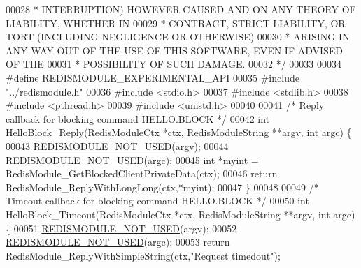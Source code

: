 \begin{DoxyCode}
00028 \textcolor{comment}{ * INTERRUPTION) HOWEVER CAUSED AND ON ANY THEORY OF LIABILITY, WHETHER IN}
00029 \textcolor{comment}{ * CONTRACT, STRICT LIABILITY, OR TORT (INCLUDING NEGLIGENCE OR OTHERWISE)}
00030 \textcolor{comment}{ * ARISING IN ANY WAY OUT OF THE USE OF THIS SOFTWARE, EVEN IF ADVISED OF THE}
00031 \textcolor{comment}{ * POSSIBILITY OF SUCH DAMAGE.}
00032 \textcolor{comment}{ */}
00033 
00034 \textcolor{preprocessor}{#}\textcolor{preprocessor}{define} \textcolor{preprocessor}{REDISMODULE\_EXPERIMENTAL\_API}
00035 \textcolor{preprocessor}{#}\textcolor{preprocessor}{include} \textcolor{preprocessor}{"../redismodule.h"}
00036 \textcolor{preprocessor}{#}\textcolor{preprocessor}{include} \textcolor{preprocessor}{<}\textcolor{preprocessor}{stdio}\textcolor{preprocessor}{.}\textcolor{preprocessor}{h}\textcolor{preprocessor}{>}
00037 \textcolor{preprocessor}{#}\textcolor{preprocessor}{include} \textcolor{preprocessor}{<}\textcolor{preprocessor}{stdlib}\textcolor{preprocessor}{.}\textcolor{preprocessor}{h}\textcolor{preprocessor}{>}
00038 \textcolor{preprocessor}{#}\textcolor{preprocessor}{include} \textcolor{preprocessor}{<}\textcolor{preprocessor}{pthread}\textcolor{preprocessor}{.}\textcolor{preprocessor}{h}\textcolor{preprocessor}{>}
00039 \textcolor{preprocessor}{#}\textcolor{preprocessor}{include} \textcolor{preprocessor}{<}\textcolor{preprocessor}{unistd}\textcolor{preprocessor}{.}\textcolor{preprocessor}{h}\textcolor{preprocessor}{>}
00040 
00041 \textcolor{comment}{/* Reply callback for blocking command HELLO.BLOCK */}
00042 \textcolor{keywordtype}{int} HelloBlock\_Reply(RedisModuleCtx *ctx, RedisModuleString **argv, \textcolor{keywordtype}{int} argc) \{
00043     \hyperlink{redismodule_8h_a46d75d81383a00bd6b941af6cadf64c2}{REDISMODULE\_NOT\_USED}(argv);
00044     \hyperlink{redismodule_8h_a46d75d81383a00bd6b941af6cadf64c2}{REDISMODULE\_NOT\_USED}(argc);
00045     \textcolor{keywordtype}{int} *myint = RedisModule\_GetBlockedClientPrivateData(ctx);
00046     \textcolor{keywordflow}{return} RedisModule\_ReplyWithLongLong(ctx,*myint);
00047 \}
00048 
00049 \textcolor{comment}{/* Timeout callback for blocking command HELLO.BLOCK */}
00050 \textcolor{keywordtype}{int} HelloBlock\_Timeout(RedisModuleCtx *ctx, RedisModuleString **argv, \textcolor{keywordtype}{int} argc) \{
00051     \hyperlink{redismodule_8h_a46d75d81383a00bd6b941af6cadf64c2}{REDISMODULE\_NOT\_USED}(argv);
00052     \hyperlink{redismodule_8h_a46d75d81383a00bd6b941af6cadf64c2}{REDISMODULE\_NOT\_USED}(argc);
00053     \textcolor{keywordflow}{return} RedisModule\_ReplyWithSimpleString(ctx,\textcolor{stringliteral}{"Request timedout"});

\end{DoxyCode}
